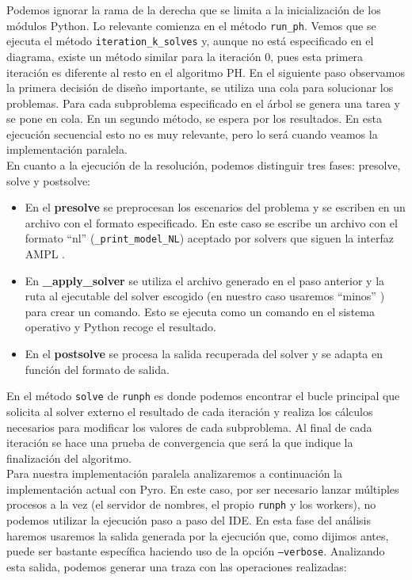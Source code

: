 Podemos ignorar la rama de la derecha que se limita a la inicialización de los módulos Python. Lo relevante comienza en el método \texttt{run\_ph}. Vemos que se ejecuta el método \texttt{iteration\_k\_solves} y, aunque no está especificado en el diagrama, existe un método similar para la iteración 0, pues esta primera iteración es diferente al resto en el algoritmo PH.
En el siguiente paso observamos la primera decisión de diseño importante, se utiliza una cola para solucionar los problemas. Para cada subproblema especificado en el árbol se genera una tarea y se pone en cola. En un segundo método, se espera por los resultados. En esta ejecución secuencial esto no es muy relevante, pero lo será cuando veamos la implementación paralela.\\

En cuanto a la ejecución de la resolución, podemos distinguir tres fases: presolve, solve y postsolve:

\begin{itemize}
    \item En el \textbf{presolve} se preprocesan los escenarios del problema y se escriben en un archivo con el formato especificado. En este caso se escribe un archivo con el formato ``nl'' (\texttt{\_print\_model\_NL}) aceptado por solvers que siguen la interfaz AMPL \cite{AMPL}.
    \item En \textbf{\_apply\_solver} se utiliza el archivo generado en el paso anterior y la ruta al ejecutable del solver escogido (en nuestro caso usaremos ``minos'' \cite{minos}) para crear un comando. Esto se ejecuta como un comando en el sistema operativo y Python recoge el resultado.
    \item En el \textbf{postsolve} se procesa la salida recuperada del solver y se adapta en función del formato de salida.
\end{itemize}

En el método \texttt{solve} de \texttt{runph} es donde podemos encontrar el bucle principal que solicita al solver externo el resultado de cada iteración y realiza los cálculos necesarios para modificar los valores de cada subproblema. Al final de cada iteración se hace una prueba de convergencia que será la que indique la finalización del algoritmo.\\

Para nuestra implementación paralela analizaremos a continuación la implementación actual con Pyro. En este caso, por ser necesario lanzar múltiples procesos a la vez (el servidor de nombres, el propio \texttt{runph} y los workers), no podemos utilizar la ejecución paso a paso del IDE. En esta fase del análisis haremos usaremos la salida generada por la ejecución que, como dijimos antes, puede ser bastante específica haciendo uso de la opción \texttt{--verbose}. Analizando esta salida, podemos generar una traza con las operaciones realizadas:\\

